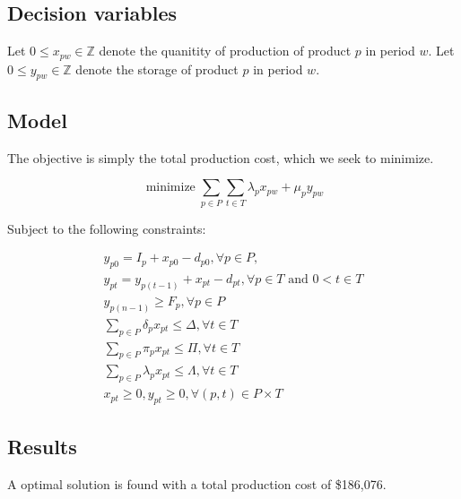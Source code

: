 \documentclass[11pt,oneside]{article}
\newcommand{\Int}{\mathbb{Z}}
\DeclareMathOperator*{\minimize}{minimize}
\begin{document}
\subsection{Decision variables}

Let $0 \leq x_{pw} \in \Int$ denote the quanitity of production of product
$p$ in period $w$. Let $0 \leq y_{pw} \in \Int$ denote the storage of product
$p$ in period $w$.

\subsection{Model}

The objective is simply the total production cost, which we seek to minimize.

$$
\minimize \sum_{p\in P}\sum_{t \in T}
\lambda_p x_{pw} + \mu_p y_{pw}
$$

Subject to the following constraints:

\begin{eqnarray}
y_{p0} = I_p + x_{p0} - d_{p0}, \forall p \in P, \\
y_{pt} = y_{p(t-1)} + x_{pt} - d_{pt}, \forall p \in T \text{ and } 0 < t \in T \\
y_{p(n-1)} \geq F_p, \forall p \in P \\
\sum_{p\in P} \delta_p x_{pt} \leq \Delta, \forall t \in T\\
\sum_{p\in P} \pi_p x_{pt} \leq \Pi, \forall t \in T \\
\sum_{p\in P} \lambda_p x_{pt} \leq \Lambda, \forall t  \in T\\
x_{pt} \geq 0, y_{pt} \geq 0, \forall (p, t) \in P\times T
\end{eqnarray}

\subsection{Results}

A optimal solution is found with a total production cost of \$186,076.
\end{document}
